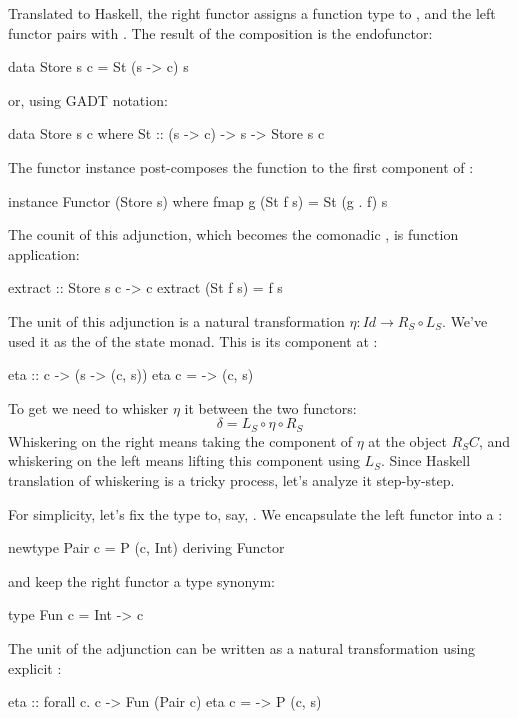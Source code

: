 \documentclass[DaoFP]{subfiles}
\begin{document}
Translated to Haskell, the right functor assigns a function type  to , and the left functor pairs  with . The result of the composition is the endofunctor:
\begin{haskell}
data Store s c = St (s -> c) s
\end{haskell}
or, using GADT notation:
\begin{haskell}
data Store s c where
    St :: (s -> c) -> s -> Store s c
\end{haskell}
The functor instance post-composes the function to the first component of  :
\begin{haskell}
instance Functor (Store s) where
  fmap g (St f s) = St (g . f) s
\end{haskell}

The counit of this adjunction, which becomes the comonadic , is function application:
\begin{haskell}
extract :: Store s c -> c
extract (St f s) = f s
\end{haskell}
The unit of this adjunction is a natural transformation $\eta \colon \mathit{Id} \to R_S \circ L_S$. We've used it as the  of the state monad. This is its component at :
\begin{haskell}
eta :: c -> (s -> (c, s))
eta c = \s -> (c, s)
\end{haskell}
To get  we need to whisker $\eta$ it between the two functors:
\[ \delta = L_S  \circ \eta \circ R_S \]
Whiskering on the right means taking the component of $\eta$ at the object $R_S C$, and whiskering on the left means lifting this component using $L_S$. Since Haskell translation of whiskering is a tricky process, let's analyze it step-by-step. 

For simplicity, let's fix the type  to, say, . We encapsulate the left functor into a :
\begin{haskell}
newtype Pair c = P (c, Int)
  deriving Functor
\end{haskell}
and keep the right functor a type synonym:
\begin{haskell}
type Fun c = Int -> c
\end{haskell}
The unit of the adjunction can be written as a natural transformation using explicit :
\begin{haskell}
eta :: forall c. c -> Fun (Pair c)
eta c = \s -> P (c, s)
\end{haskell}
\end{document}
